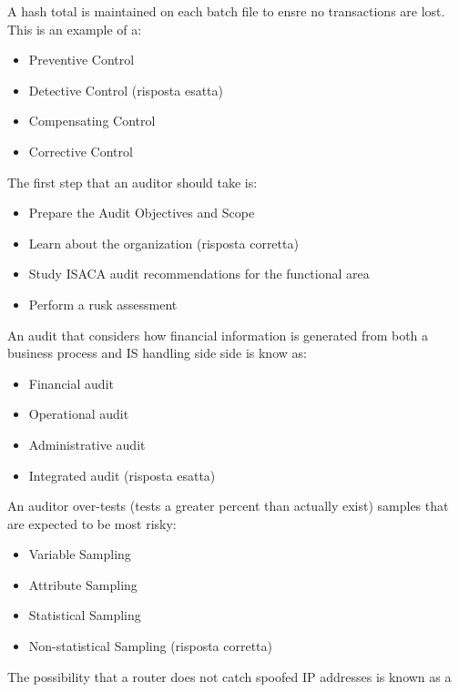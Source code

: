 

A hash total is maintained on each batch file to ensre no transactions are lost. This is an example of a:
\begin{itemize}
\item Preventive Control
\item Detective Control (risposta esatta)
\item Compensating Control
\item Corrective Control
\end{itemize}




The first step that an auditor should take is:
\begin{itemize}
\item Prepare the Audit Objectives and Scope
\item Learn about the organization (risposta corretta)
\item Study ISACA audit recommendations for the functional area
\item Perform a rusk assessment
\end{itemize}


An audit that considers how financial information is generated from both a business process and IS handling side side is know as:
\begin{itemize}
\item Financial audit
\item Operational audit
\item Administrative audit
\item Integrated audit (risposta esatta)
\end{itemize}


An auditor over-tests (tests a greater percent than actually exist) samples that are expected to be most risky:
\begin{itemize}
\item Variable Sampling
\item Attribute Sampling
\item Statistical Sampling
\item Non-statistical Sampling (risposta corretta)
\end{itemize}


The possibility that a router does not catch spoofed IP addresses is known as a

